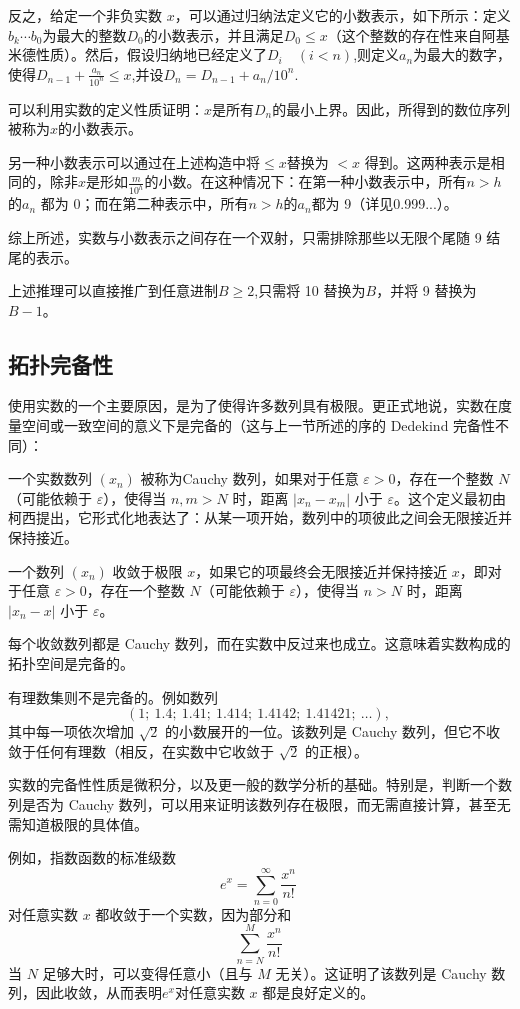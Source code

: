 反之，给定一个非负实数 $x$，可以通过归纳法定义它的小数表示，如下所示：定义$b_{k}\cdots b_{0}$为最大的整数$D_{0}$的小数表示，并且满足$D_{0} \leq x$（这个整数的存在性来自阿基米德性质）。然后，假设归纳地已经定义了$D_{i} \quad (i<n)$,则定义$a_{n}$为最大的数字，使得$D_{n-1} + \tfrac{a_{n}}{10^{n}} \leq x$,并设$D_{n} = D_{n-1} + a_{n}/10^{n}$.

可以利用实数的定义性质证明：$x$是所有$D_{n}$的最小上界。因此，所得到的数位序列被称为$x$的小数表示。

另一种小数表示可以通过在上述构造中将$\leq x$替换为 $<x$ 得到。这两种表示是相同的，除非$x$是形如$\frac{m}{10^{h}}$的小数。在这种情况下：在第一种小数表示中，所有$n>h$ 的$a_{n}$ 都为 0；而在第二种表示中，所有$n>h$的$a_{n}$都为 9（详见0.999...）。

综上所述，实数与小数表示之间存在一个双射，只需排除那些以无限个尾随 9 结尾的表示。

上述推理可以直接推广到任意进制$B \geq 2$,只需将 10 替换为$B$，并将 9 替换为 $B-1$。
\subsection{拓扑完备性}
使用实数的一个主要原因，是为了使得许多数列具有极限。更正式地说，实数在度量空间或一致空间的意义下是完备的（这与上一节所述的序的 Dedekind 完备性不同）：

一个实数数列 $(x_{n})$ 被称为Cauchy 数列，如果对于任意 $\varepsilon > 0$，存在一个整数 $N$（可能依赖于 $\varepsilon$），使得当 $n, m > N$ 时，距离 $|x_{n} - x_{m}|$ 小于 $\varepsilon$。这个定义最初由柯西提出，它形式化地表达了：从某一项开始，数列中的项彼此之间会无限接近并保持接近。

一个数列 $(x_{n})$ 收敛于极限 $x$，如果它的项最终会无限接近并保持接近 $x$，即对于任意 $\varepsilon > 0$，存在一个整数 $N$（可能依赖于 $\varepsilon$），使得当 $n > N$ 时，距离 $|x_{n} - x|$ 小于 $\varepsilon$。

每个收敛数列都是 Cauchy 数列，而在实数中反过来也成立。这意味着实数构成的拓扑空间是完备的。

有理数集则不是完备的。例如数列
$$
(1;\ 1.4;\ 1.41;\ 1.414;\ 1.4142;\ 1.41421;\ \ldots),~
$$
其中每一项依次增加 $\sqrt{2}$ 的小数展开的一位。该数列是 Cauchy 数列，但它不收敛于任何有理数（相反，在实数中它收敛于 $\sqrt{2}$ 的正根）。

实数的完备性性质是微积分，以及更一般的数学分析的基础。特别是，判断一个数列是否为 Cauchy 数列，可以用来证明该数列存在极限，而无需直接计算，甚至无需知道极限的具体值。

例如，指数函数的标准级数
$$
e^{x}=\sum_{n=0}^{\infty}\frac{x^{n}}{n!}~
$$
对任意实数 $x$ 都收敛于一个实数，因为部分和
$$
\sum_{n=N}^{M}\frac{x^{n}}{n!}~
$$
当 $N$ 足够大时，可以变得任意小（且与 $M$ 无关）。这证明了该数列是 Cauchy 数列，因此收敛，从而表明$e^{x}$对任意实数 $x$ 都是良好定义的。
